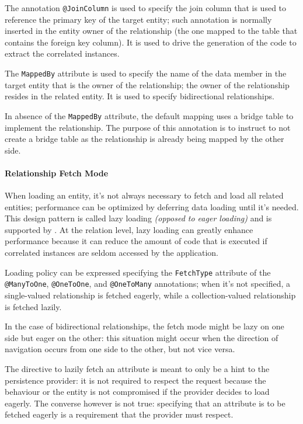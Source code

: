 \documentclass[english]{article}
\begin{document}
The annotation \texttt{@JoinColumn} is used to specify the join column that is used to reference the primary key of the target entity; such annotation is normally inserted in the entity owner of the relationship (the one mapped to the table that contains the foreign key column).
It is used to drive the generation of the \sql code to extract the correlated instances.

The \texttt{MappedBy} attribute is used to specify the name of the data member in the target entity that is the owner of the relationship; the owner of the relationship resides in the related entity.
It is used to specify bidirectional relationships.

In absence of the \texttt{MappedBy} attribute, the default \jpa mapping uses a bridge table to implement the relationship.
The purpose of this annotation is to instruct \jpa to not create a bridge table as the relationship is already being mapped by the other side.

\paragraph{Relationship Fetch Mode}

When loading an entity, it's not always necessary to fetch and load all related entities;
performance can be optimized by deferring data loading until it's needed.
This design pattern is called lazy loading \textit{(opposed to eager loading)} and is supported by \jpa.
At the relation level, lazy loading can greatly enhance performance because it can reduce the amount of \sql code that is executed if correlated instances are seldom accessed by the application.

Loading policy can be expressed specifying the \texttt{FetchType} attribute of the \texttt{@ManyToOne}, \texttt{@OneToOne}, and \texttt{@OneToMany} annotations;
when it's not specified, a single-valued relationship is fetched eagerly, while a collection-valued relationship is fetched lazily.

In the case of bidirectional relationships, the fetch mode might be lazy on one side but eager on the other: this situation might occur when the direction of navigation occurs from one side to the other, but not vice versa.

The directive to lazily fetch an attribute is meant to only be a hint to the persistence provider:
it is not required to respect the request because the behaviour or the entity is not compromised if the provider decides to load eagerly.
The converse however is not true: specifying that an attribute is to be fetched eagerly is a requirement that the provider must respect.
\end{document}
